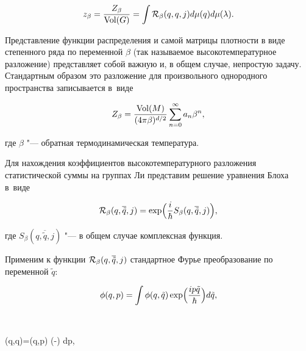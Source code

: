 \begin{equation}\label{e:11.16}

z_{\beta}= \frac{Z_{\beta}}{\mathop{\rm Vol}(G)}=\int {\cal R}_{\beta}(q,q,j) d\mu(q) d\mu(\lambda).

\end{equation}



\smallskip




Представление функции распределения и самой матрицы плотности в виде степенного ряда по переменной $\beta$ (так называемое высокотемпературное разложение) представляет собой важную и, в общем случае, непростую задачу. Стандартным образом это разложение для произвольного однородного пространства записывается в~виде

\begin{equation}\label{e:1.6}

Z_{\beta}=\frac{\mathop{\rm Vol}(M)}{(4 \pi \beta)^{d/2}}\sum\limits_{n=0}^{\infty} a_n \beta^n,

\end{equation}

где $\beta$ "--- обратная термодинамическая температура.



Для нахождения коэффициентов высокотемпературного разложения статистической суммы на группах Ли представим решение уравнения Блоха в~виде

\begin{equation}\label{e:4.1}

{\cal R}_{\beta}(q,\overline{\tilde q},j)=\exp\Bigl(\frac{i}{\hbar}S_{\beta}(q,\overline{\tilde q},j)\Bigr),

\end{equation}

где $S_{\beta}(q,\overline{\tilde q},j)$ "--- в общем случае комплексная функция.



Применим к функции ${\cal R}_{\beta}(q,\overline{\tilde q},j)$ стандартное Фурье преобразование по переменной $\tilde q$:

$$

\phi(q,p)=\int \phi(q,\tilde q) \exp\Bigl(\frac{ip\tilde q}{\hbar}\Bigr) d \tilde q,

$$

$$

\phi(q,\tilde q)=\int \phi(q,p) \exp\Bigl(-\Bigr) dp,

